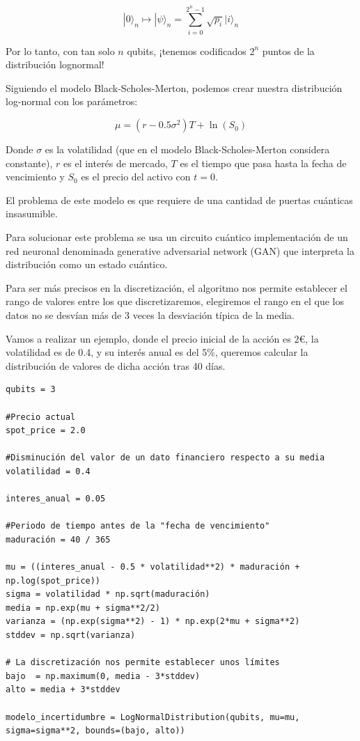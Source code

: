 $$ |0\rangle_n \mapsto |\psi\rangle_n = \sum_{i=0}^{2^n-1} \sqrt{p_i}|i\rangle_n $$

Por lo tanto, con tan solo $n$ qubits, ¡tenemos codificados $2^n$ puntos de la distribución lognormal!

Siguiendo el modelo Black-Scholes-Merton, podemos crear nuestra distribución log-normal con los parámetros:

$$ \mu = (r-0.5\sigma^2)T+\ln\left(S_0\right) $$

Donde $\sigma$ es la volatilidad (que en el modelo Black-Scholes-Merton considera constante), $r$ es el interés de mercado, $T$ es el tiempo que pasa hasta la fecha de vencimiento y $S_0$ es el precio del activo con $t=0$.

El problema de este modelo es que requiere de una cantidad de puertas cuánticas insasumible.

Para solucionar este problema se usa un circuito cuántico implementación de un red neuronal denominada generative adversarial network (GAN) que interpreta la distribución como un estado cuántico.

Para ser más precisos en la discretización, el algoritmo nos permite establecer el rango de valores entre los que discretizaremos, elegiremos el rango en el que los datos no se desvían más de 3 veces la desviación típica de la media.

Vamos a realizar un ejemplo, donde el precio inicial de la acción es $2€$, la volatilidad es de 0.4, y su interés anual es del 5\%, queremos calcular la distribución de valores de dicha acción tras 40 días.

\begin{verbatim}
qubits = 3

#Precio actual
spot_price = 2.0

#Disminución del valor de un dato financiero respecto a su media
volatilidad = 0.4

interes_anual = 0.05

#Periodo de tiempo antes de la "fecha de vencimiento"
maduración = 40 / 365

mu = ((interes_anual - 0.5 * volatilidad**2) * maduración + np.log(spot_price))
sigma = volatilidad * np.sqrt(maduración)
media = np.exp(mu + sigma**2/2)
varianza = (np.exp(sigma**2) - 1) * np.exp(2*mu + sigma**2)
stddev = np.sqrt(varianza)

# La discretización nos permite establecer unos límites
bajo  = np.maximum(0, media - 3*stddev)
alto = media + 3*stddev

modelo_incertidumbre = LogNormalDistribution(qubits, mu=mu, sigma=sigma**2, bounds=(bajo, alto))
\end{verbatim}

